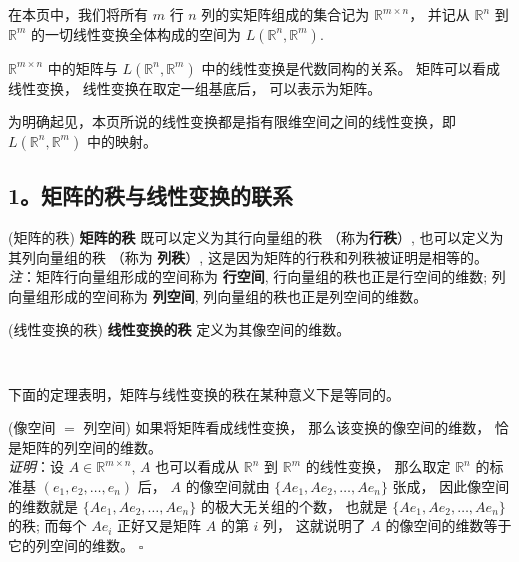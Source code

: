 

在本页中，我们将所有 $m$ 行 $n$ 列的实矩阵组成的集合记为 $\mathbb{R}^{m\times n}$， 并记从 $\mathbb{R}^{n}$ 到 $\mathbb{R}^{m}$ 的一切线性变换全体构成的空间为 $L(\mathbb{R}^{n},\mathbb{R}^{m}).$

$\mathbb{R}^{m\times n}$ 中的矩阵与 $L(\mathbb{R}^{n},\mathbb{R}^{m})$
中的线性变换是代数同构的关系。 矩阵可以看成线性变换， 线性变换在取定一组基底后， 可以表示为矩阵。 

为明确起见，本页所说的线性变换都是指有限维空间之间的线性变换，即 $L(\mathbb{R}^{n},\mathbb{R}^{m})$ 中的映射。

\subsection{1。矩阵的秩与线性变换的联系}

\begin{definition}{(矩阵的秩)}\label{def_linmat_2}
\textbf{矩阵的秩} 既可以定义为其行向量组的秩 （称为\textbf{行秩}）, 也可以定义为其列向量组的秩 （称为 \textbf{列秩}）,
这是因为矩阵的行秩和列秩被证明是相等的。 \\

\textsl{注}：矩阵行向量组形成的空间称为 \textbf{行空间}, 行向量组的秩也正是行空间的维数;
列向量组形成的空间称为 \textbf{列空间}, 列向量组的秩也正是列空间的维数。
\end{definition}



\begin{definition}{(线性变换的秩)}
\textbf{线性变换的秩} 定义为其像空间的维数。
\end{definition} 
\verb| |

下面的定理表明，矩阵与线性变换的秩在某种意义下是等同的。
\begin{theorem}{(像空间 $=$ 列空间)}\label{the_linmat_1}
 如果将矩阵看成线性变换， 那么该变换的像空间的维数， 恰是矩阵的列空间的维数。\\

\textsl{ 证明}：设 $A\in\mathbb{R}^{m\times n}$, $A$ 也可以看成从 $\mathbb{R}^{n}$ 到 $\mathbb{R}^{m}$
的线性变换， 那么取定 $\mathbb{R}^{n}$ 的标准基 $(e_{1},e_{2},\ldots,e_{n})$ 后，
$A$ 的像空间就由 $\{Ae_{1},Ae_{2},\ldots,Ae_{n}\}$ 张成， 因此像空间的维数就是 $\{Ae_{1},Ae_{2},\ldots,Ae_{n}\}$
的极大无关组的个数， 也就是 $\{Ae_{1},Ae_{2},\ldots,Ae_{n}\}$ 的秩; 而每个 $Ae_{i}$
正好又是矩阵 $A$ 的第 $i$ 列， 这就说明了 $A$ 的像空间的维数等于它的列空间的维数。 $\square$
\end{theorem}

